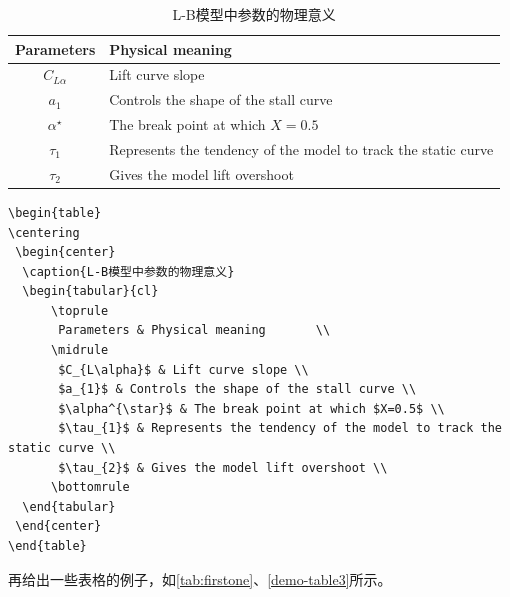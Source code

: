 \begin{table}              %
\centering
 \begin{center}
  \caption{L-B模型中参数的物理意义}
  \label{tab:LB-parameters}
  \begin{tabular}{cl}
      \toprule
       Parameters & Physical meaning       \\
      \midrule   %
       $C_{L\alpha}$ & Lift curve slope \\
       $a_{1}$ & Controls the shape of the stall curve \\
       $\alpha^{\star}$ & The break point at which $X=0.5$ \\
       $\tau_{1}$ & Represents the tendency of the model to track the static curve \\
       $\tau_{2}$ & Gives the model lift overshoot \\
      \bottomrule
  \end{tabular}
 \end{center}
\end{table}

\begin{lstlisting}[language={[LaTeX]TeX}, caption={插入\autoref{tab:LB-parameters}}, label=demo-table2]
\begin{table}
\centering
 \begin{center}
  \caption{L-B模型中参数的物理意义}
  \begin{tabular}{cl}
      \toprule
       Parameters & Physical meaning       \\
      \midrule 
       $C_{L\alpha}$ & Lift curve slope \\
       $a_{1}$ & Controls the shape of the stall curve \\
       $\alpha^{\star}$ & The break point at which $X=0.5$ \\
       $\tau_{1}$ & Represents the tendency of the model to track the static curve \\
       $\tau_{2}$ & Gives the model lift overshoot \\
      \bottomrule
  \end{tabular}
 \end{center}
\end{table}
\end{lstlisting}

再给出一些表格的例子，如\autoref{tab:firstone}、\autoref{demo-table3}所示。

